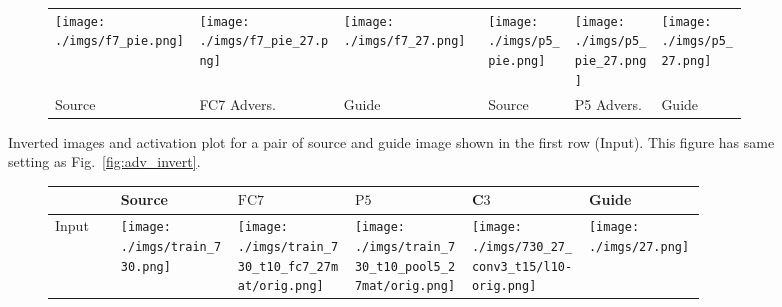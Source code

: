\documentclass{article} %
\begin{document}
\begin{figure*}[h!]
\begin{subfigure}[t]{\linewidth}{
\centering
\renewcommand{\arraystretch}{1}
\setlength\tabcolsep{.1pt}
\begin{tabular}{
|>{\centering\arraybackslash}m{0.205\linewidth}
>{\centering\arraybackslash}m{0.205\linewidth}
>{\centering\arraybackslash}m{0.205\linewidth}|
>{\centering\arraybackslash}m{0.125\linewidth}
>{\centering\arraybackslash}m{0.125\linewidth}
>{\centering\arraybackslash}m{0.125\linewidth}|
}
\hline
\texttt{[image: ./imgs/f7\_pie.png]} &
\texttt{[image: ./imgs/f7\_pie\_27.png]} &
\texttt{[image: ./imgs/f7\_27.png]} &
\texttt{[image: ./imgs/p5\_pie.png]} &
\texttt{[image: ./imgs/p5\_pie\_27.png]} &
\texttt{[image: ./imgs/p5\_27.png]}\\
Source & FC7 Advers. & Guide & Source & P5 Advers. & Guide \\ \hline
\end{tabular}
}
\end{subfigure}
\caption{
    Inverted images and activation plot for a pair of source and guide image 
    shown in the first row (Input). This figure has same setting as 
    Fig.~\ref{fig:adv_invert}.
}
\label{fig:adv_invert4}
\end{figure*}\begin{figure}[h!]
    \centering
\begin{subfigure}[t]{\linewidth}{
\renewcommand{\arraystretch}{1}
\setlength\tabcolsep{2pt}
\begin{tabular}{|
>{\centering\arraybackslash}m{0.09\linewidth} |
>{\centering\arraybackslash}m{0.167\linewidth} |
>{\centering\arraybackslash}m{0.167\linewidth}
>{\centering\arraybackslash}m{0.167\linewidth}
>{\centering\arraybackslash}m{0.167\linewidth} |
>{\centering\arraybackslash}m{0.167\linewidth} | }
\hline
& Source & $\text{FC}7$ & $\text{P}5$ & C$3$ &Guide  \\\hline Input 
& \texttt{[image: ./imgs/train\_730.png]} 
& \texttt{[image: ./imgs/train\_730\_t10\_fc7\_27mat/orig.png]} 
&
\texttt{[image: ./imgs/train\_730\_t10\_pool5\_27mat/orig.png]} &
\texttt{[image: ./imgs/730\_27\_conv3\_t15/l10-orig.png]} &
\texttt{[image: ./imgs/27.png]} \\

\end{tabular}}
\end{subfigure}
\end{figure}
\end{document}
